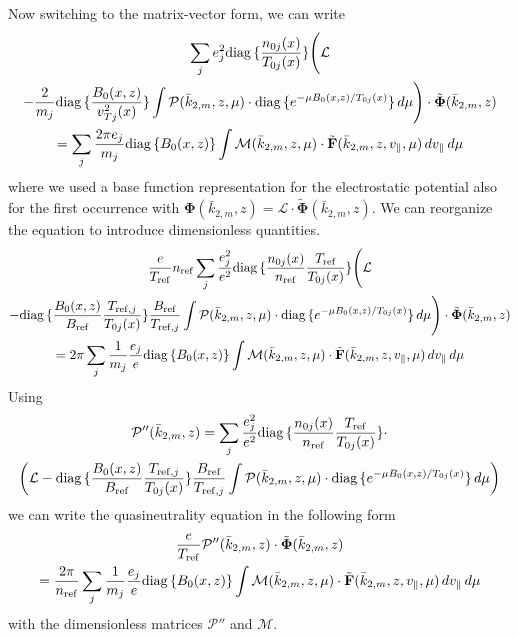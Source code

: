 Now switching to the matrix-vector form, we can write
\begin{multline*}
  \sum_je_j^2 \mbox{diag}\,\{\frac{n_{0j}(x)}{T_{0j}(x)}\}\Bigg(
    \mathcal{L}\\
    -\frac{2}{m_j}\mbox{diag}\,\{\frac{B_0(x,z)}{v_{Tj}^2(x)}\}
    \int \mathcal{P}(\bar{k}_{2,m},z,\mu)
    \cdot\mbox{diag}\,\{e^{-\mu B_0(x,z)/T_{0j}(x)}\}\,d\mu
  \Bigg)\cdot\tilde{\mathbf{\Phi}}(\bar{k}_{2,m},z) \\
  = \sum_j \frac{2\pi e_j}{m_j}\mbox{diag}\,\{B_0(x,z)\}\int 
  \mathcal{M}(\bar{k}_{2,m},z,\mu)\cdot\tilde{\mathbf{F}}(\bar{k}_{2,m},z,v_\|,\mu)\,dv_\|\,d\mu
\end{multline*}
where we used a base function representation for the electrostatic potential also for
the first occurrence with
$\mathbf{\Phi}(\bar{k}_{2,m},z)=\mathcal{L}\cdot\tilde{\mathbf{\Phi}}(\bar{k}_{2,m},z)$.
We can reorganize the equation to introduce dimensionless quantities.
\begin{multline*}
  \frac{e}{T_{\mathrm{ref}}}n_{\mathrm{ref}}\sum_j\frac{e_j^2}{e^2} \mbox{diag}\,\{\frac{n_{0j}(x)}{n_{\mathrm{ref}}}\frac{T_{\mathrm{ref}}}{T_{0j}(x)}\}\Bigg(
    \mathcal{L}\\
    -\mbox{diag}\,\{\frac{B_0(x,z)}{B_{\mathrm{ref}}}\frac{T_{\mathrm{ref},j}}{T_{0j}(x)}\}\frac{B_{\mathrm{ref}}}{T_{\mathrm{ref},j}}\int \mathcal{P}(\bar{k}_{2,m},z,\mu)
    \cdot\mbox{diag}\,\{e^{-\mu B_0(x,z)/T_{0j}(x)}\}\,d\mu
  \Bigg)\cdot\tilde{\mathbf{\Phi}}(\bar{k}_{2,m},z) \\
  = 2\pi\sum_j \frac{1}{m_j}\frac{e_j}{e}\mbox{diag}\,\{B_0(x,z)\}\int 
  \mathcal{M}(\bar{k}_{2,m},z,\mu)\cdot\tilde{\mathbf{F}}(\bar{k}_{2,m},z,v_\|,\mu)\,dv_\|\,d\mu
\end{multline*}
Using 
\begin{multline*}
  \mathcal{P}''(\bar{k}_{2,m},z) = \sum_j\frac{e_j^2}{e^2}
  \mbox{diag}\,\{\frac{n_{0j}(x)}{n_{\mathrm{ref}}}\frac{T_{\mathrm{ref}}}{T_{0j}(x)}\}\cdot\\
  \left(
    \mathcal{L}
    -\mbox{diag}\,\{\frac{B_0(x,z)}{B_{\mathrm{ref}}}\frac{T_{\mathrm{ref},j}}{T_{0j}(x)}\}\frac{B_{\mathrm{ref}}}{T_{\mathrm{ref},j}}\int \mathcal{P}(\bar{k}_{2,m},z,\mu)
    \cdot\mbox{diag}\,\{e^{-\mu B_0(x,z)/T_{0j}(x)}\}\,d\mu
  \right)
\end{multline*}
we can write the quasineutrality equation in the following form
\begin{multline*}
  \frac{e}{T_{\mathrm{ref}}} \mathcal{P}''(\bar{k}_{2,m},z)\cdot\tilde{\mathbf{\Phi}}(\bar{k}_{2,m},z) \\
  = \frac{2\pi}{n_{\mathrm{ref}}}\sum_j \frac{1}{m_j}\frac{e_j}{e}\mbox{diag}\,\{B_0(x,z)\}\int 
  \mathcal{M}(\bar{k}_{2,m},z,\mu)\cdot\tilde{\mathbf{F}}(\bar{k}_{2,m},z,v_\|,\mu)\,dv_\|\,d\mu
\end{multline*}
with the dimensionless matrices $\mathcal{P}''$ and $\mathcal{M}$.

